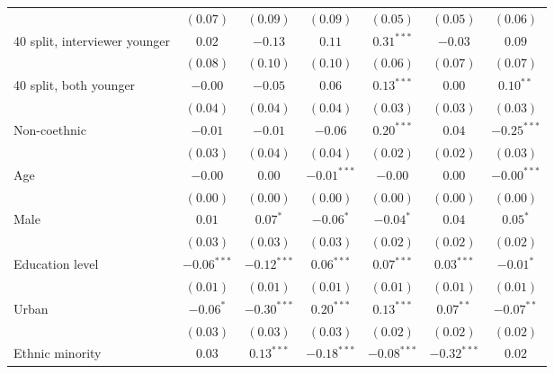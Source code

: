 \begin{table}
\begin{center}
\begin{threeparttable}
\begin{tabular}{l c c c c c c}
                                & $(0.07)$      & $(0.09)$      & $(0.09)$      & $(0.05)$      & $(0.05)$      & $(0.06)$      \\
40 split, interviewer younger   & $0.02$        & $-0.13$       & $0.11$        & $0.31^{***}$  & $-0.03$       & $0.09$        \\
                                & $(0.08)$      & $(0.10)$      & $(0.10)$      & $(0.06)$      & $(0.07)$      & $(0.07)$      \\
40 split, both younger          & $-0.00$       & $-0.05$       & $0.06$        & $0.13^{***}$  & $0.00$        & $0.10^{**}$   \\
                                & $(0.04)$      & $(0.04)$      & $(0.04)$      & $(0.03)$      & $(0.03)$      & $(0.03)$      \\
Non-coethnic                    & $-0.01$       & $-0.01$       & $-0.06$       & $0.20^{***}$  & $0.04$        & $-0.25^{***}$ \\
                                & $(0.03)$      & $(0.04)$      & $(0.04)$      & $(0.02)$      & $(0.02)$      & $(0.03)$      \\
Age                             & $-0.00$       & $0.00$        & $-0.01^{***}$ & $-0.00$       & $0.00$        & $-0.00^{***}$ \\
                                & $(0.00)$      & $(0.00)$      & $(0.00)$      & $(0.00)$      & $(0.00)$      & $(0.00)$      \\
Male                            & $0.01$        & $0.07^{*}$    & $-0.06^{*}$   & $-0.04^{*}$   & $0.04$        & $0.05^{*}$    \\
                                & $(0.03)$      & $(0.03)$      & $(0.03)$      & $(0.02)$      & $(0.02)$      & $(0.02)$      \\
Education level                 & $-0.06^{***}$ & $-0.12^{***}$ & $0.06^{***}$  & $0.07^{***}$  & $0.03^{***}$  & $-0.01^{*}$   \\
                                & $(0.01)$      & $(0.01)$      & $(0.01)$      & $(0.01)$      & $(0.01)$      & $(0.01)$      \\
Urban                           & $-0.06^{*}$   & $-0.30^{***}$ & $0.20^{***}$  & $0.13^{***}$  & $0.07^{**}$   & $-0.07^{**}$  \\
                                & $(0.03)$      & $(0.03)$      & $(0.03)$      & $(0.02)$      & $(0.02)$      & $(0.02)$      \\
Ethnic minority                 & $0.03$        & $0.13^{***}$  & $-0.18^{***}$ & $-0.08^{***}$ & $-0.32^{***}$ & $0.02$        \\

\end{tabular}
\end{threeparttable}
\end{center}
\end{table}

